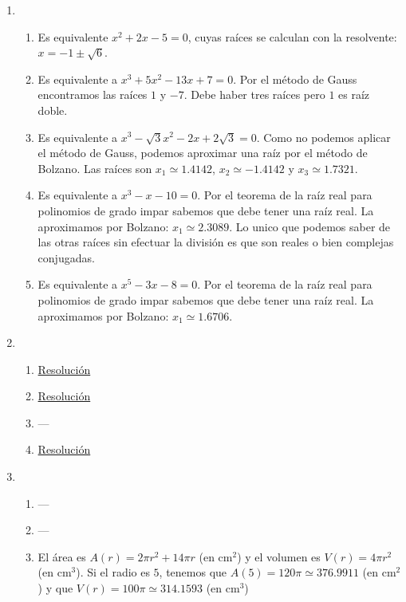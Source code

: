 \documentclass[a4paper]{article}
\newcommand{\exercise}{\item}
\begin{document}
\begin{enumerate}
\begin{enumerate} [label=(\alph*)]
		\item Sacamos factor común y obtenemos el polinomio $x^2(x^4-x^2-20)$. Para buscar las raíces restantes realizamos la sustitución $t^2$ y el polinomio resultante es $t(t^2-t-20)$. Con la resolvente obtenemos los valores de $t=5$, del que obtenemos $x=\pm \sqrt{5}$, y $t=-4$, del que obtenemos $x=\pm2i$. Finalmenta la factorización compleja queda como: $x^2(x-\sqrt{5})(x+\sqrt{5})(x-2i)(x+2i)$. Y la factorización real queda como $x^2(x-\sqrt{5})(x+\sqrt{5})(x^+4)$.
		\item \href{https://youtu.be/EQIEmdkGOZE}{Resolución}
		\item \href{https://youtu.be/BCo0pxE288w}{Resolución}
\end{enumerate}\exercise\begin{enumerate} [label=(\alph*)]		\item Es equivalente $x^2+2x-5=0$, cuyas raíces se calculan con la resolvente: $x=-1\pm\sqrt{6}$.
		\item Es equivalente a $x^3+5x^2-13x +7 =0$. Por el método de Gauss encontramos las raíces $1$ y $-7$. Debe haber tres raíces pero $1$ es raíz doble.
		\item Es equivalente a $x^3 -\sqrt{3}x^2 - 2x + 2\sqrt{3} = 0$. Como no podemos aplicar el método de Gauss, podemos aproximar una raíz por el método de Bolzano. Las raíces son $x_1 \simeq 1.4142$, $x_2 \simeq -1.4142$ y $x_3 \simeq 1.7321$.
		\item Es equivalente a $x^3-x-10=0$. Por el teorema de la raíz real para polinomios de grado impar sabemos que debe tener una raíz real. La aproximamos por Bolzano: $x_1 \simeq 2.3089$. Lo unico que podemos saber de las otras raíces sin efectuar la división es que son reales o bien complejas conjugadas.
		\item Es equivalente a $x^5-3x-8=0$. Por el teorema de la raíz real para polinomios de grado impar sabemos que debe tener una raíz real. La aproximamos por Bolzano: $x_1 \simeq 1.6706$. 
\end{enumerate}\exercise\begin{enumerate} [label=(\alph*)]		\item \href{https://youtu.be/_XVYatmUKBg}{Resolución}
		\item \href{https://youtu.be/LDpq_f-baPc}{Resolución}
\item ---		\item \href{https://youtu.be/LDpq_f-baPc}{Resolución}
\end{enumerate}\exercise\begin{enumerate} [label=(\alph*)]\item ---\item ---		\item El área es $A(r)=2 \pi r^2+ 14 \pi r$ (en cm$^2$) y el volumen es $V(r)=4 \pi r^2$ (en cm$^3$). Si el radio es $5$, tenemos que $A(5)=120\pi \simeq 376.9911$ (en cm$^2$) y que $V(r)=100\pi \simeq 314.1593$ (en cm$^3$)

\end{enumerate}
\end{enumerate}
\end{document}
